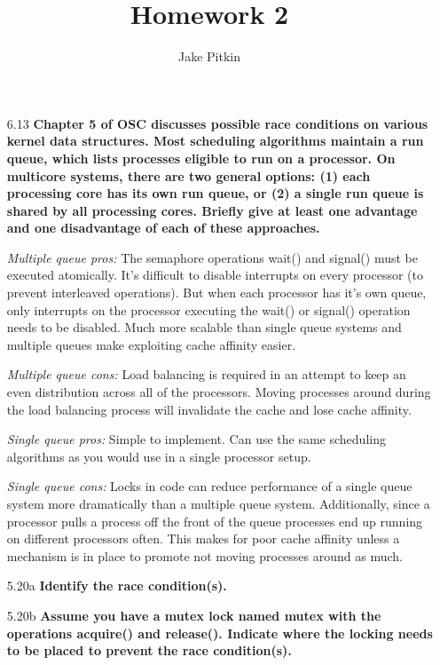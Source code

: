 \documentclass[11pt, letterpaper]{hw}
\title{Homework 2}
\institute{University of Utah}
\author{Jake Pitkin}
\begin{document}
\maketitle

\begin{enumerate}

\item [6.13] \textbf{Chapter 5 of OSC discusses possible race conditions on various kernel data structures. Most scheduling algorithms maintain a run queue, which lists processes eligible to run on a processor. On multicore systems, there are two general options: (1) each processing core has its own run queue, or (2) a single run queue is shared by all processing cores. Briefly give at least one advantage and one disadvantage of each of these approaches.}

{\it Multiple queue pros:} The semaphore operations wait() and signal() must be executed atomically. It's difficult to disable interrupts on every processor (to prevent interleaved operations). But when each processor has it's own queue, only interrupts on the processor executing the wait() or signal() operation needs to be disabled. Much more scalable than single queue systems and multiple queues make exploiting cache affinity easier.

{\it Multiple queue cons:} Load balancing is required in an attempt to keep an even distribution across all of the processors. Moving processes around during the load balancing process will invalidate the cache and lose cache affinity.

{\it Single queue pros:} Simple to implement. Can use the same scheduling algorithms as you would use in a single processor setup.

{\it Single queue cons:} Locks in code can reduce performance of a single queue system more dramatically than a multiple queue system. Additionally, since a processor pulls a process off the front of the queue processes end up running on different processors often. This makes for poor cache affinity unless a mechanism is in place to promote not moving processes around as much.

\item [5.20a] \textbf{Identify the race condition(s).}
 
\item [5.20b] \textbf{Assume you have a mutex lock named mutex with the operations acquire() and release(). Indicate where the locking needs to be placed to prevent the race condition(s).}


\end{enumerate}
\end{document}
